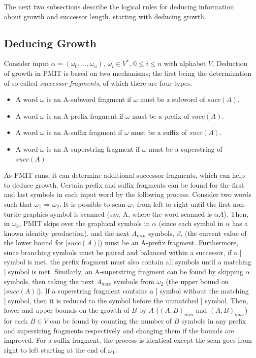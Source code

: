 \documentclass{llncs}
\begin{document}
	The next two subsections describe the logical rules for deducing information about growth and successor length, starting with deducing growth.
	
	\subsection{Deducing Growth}
	
	Consider input $\alpha = (\omega_{0}, \ldots, \omega_{n})$, $\omega_{i} \in V^{*}$, $0 \leq i \leq n$ with alphabet $V$. Deduction of growth in PMIT is based on two mechanisms; the first being the determination of so-called \textit{successor fragments}, of which there are four types. 
	
	\begin{itemize}
		\item A word $\omega$ is an A-subword fragment if $\omega$ must be a subword of $succ(A)$.
		\item A word $\omega$ is an A-prefix fragment if $\omega$ must be a prefix of $succ(A)$.
		\item A word $\omega$ is an A-suffix fragment if $\omega$ must be a suffix of $succ(A)$.
		\item A word $\omega$ is an A-superstring fragment if $\omega$ must be a superstring of $succ(A)$.
	\end{itemize}
	
	As PMIT runs, it can determine additional successor fragments, which can help to deduce growth. Certain prefix and suffix fragments can be found for the first and last symbols in each input word by the following process.  Consider two words such that $\omega_{1} \Rightarrow \omega_{2}$. It is possible to scan $\omega_{1}$ from left to right until the first non-turtle graphics symbol is scanned (say, A, where the word scanned is $\alpha A$). Then, in $\omega_{2}$, PMIT skips over the graphical symbols in $\alpha$ (since each symbol in $\alpha$ has a known identity production), and the next $A_{min}$ symbols, $\beta$, (the current value of the lower bound for $|succ(A)|$) must be an A-prefix fragment. Furthermore, since branching symbols must be paired and balanced within a successor, if a $[$ symbol is met, the prefix fragment must also contain all symbols until a matching $]$ symbol is met. Similarly, an A-superstring fragment can be found by skipping $\alpha$ symbols, then taking the next $A_{max}$ symbols from $\omega_{2}$ (the upper bound on $|succ(A)|$). If a superstring fragment contains a $[$ symbol without the matching $]$ symbol, then it is reduced to the symbol before the unmatched $[$ symbol. Then, lower and upper bounds on the growth of $B$ by $A$ ($(A,B)_{min}$ and $(A,B)_{max}$) for each $B \in V$ can be found by counting the number of $B$ symbols in any prefix and superstring fragments respectively and changing them if the bounds are improved. For a suffix fragment, the process is identical except the scan goes from right to left starting at the end of $\omega_{1}$.
	
\end{document}
